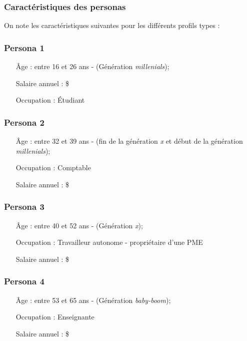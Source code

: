 \documentclass[11pt,french]{article}\usepackage[]{graphicx}\usepackage[]{color}
\begin{document}
\subsubsection*{Caractéristiques des personas}
On note les caractéristiques suivantes pour les différents profils types :

\subsubsection*{Persona 1}
\label{per1}
\begin{itemize}
\item[Âge :] entre 16 et 26 ans - (Génération \emph{millenials});
\item[Salaire annuel :]  \$
\item[Occupation :] Étudiant
\end{itemize}

\subsubsection*{Persona 2}
\label{per2}
\begin{itemize}
\item[Âge :] entre 32 et 39 ans - (fin de la génération \emph{x} et début de la génération \emph{millenials});
\item[Occupation :] Comptable
\item[Salaire annuel :]  \$
\end{itemize}

\subsubsection*{Persona 3}
\label{per3}
\begin{itemize}
\item[Âge :] entre 40 et 52 ans - (Génération \emph{x});
\item[Occupation :] Travailleur autonome - propriétaire d'une PME
\item[Salaire annuel :]  \$
\end{itemize}

\subsubsection*{Persona 4}
\label{per4}
\begin{itemize}
\item[Âge :] entre 53 et 65 ans - (Génération \emph{baby-boom});
\item[Occupation :] Enseignante
\item[Salaire annuel :]  \$
\end{itemize}
\end{document}
